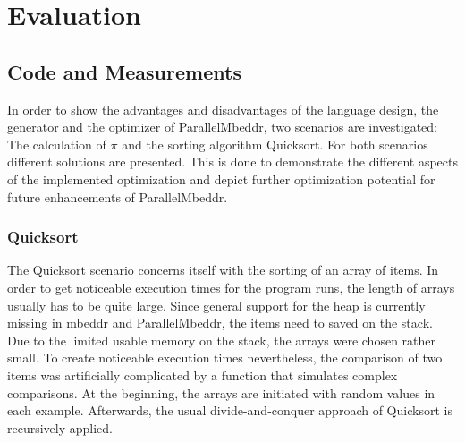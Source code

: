 \chapter{Evaluation}
\label{evaluation}
\section{Code and Measurements}
In order to show the advantages and disadvantages of the language design, the generator and the optimizer of ParallelMbeddr, two scenarios are investigated: The calculation of $\pi$ and the sorting algorithm Quicksort. For both scenarios different solutions are presented. This is done to demonstrate the different aspects of the implemented optimization and depict further optimization potential for future enhancements of ParallelMbeddr.

\subsection{Quicksort}
The Quicksort scenario concerns itself with the sorting of an array of items. In order to get noticeable execution times for the program runs, the length of arrays usually has to be quite large. Since general support for the heap is currently missing in mbeddr and ParallelMbeddr, the items need to saved on the stack. Due to the limited usable memory on the stack, the arrays were chosen rather small. To create noticeable execution times nevertheless, the comparison of two items was artificially complicated by a function  that simulates complex comparisons. At the beginning, the arrays are initiated with random values in each example. Afterwards, the usual divide-and-conquer approach of Quicksort is recursively applied.
